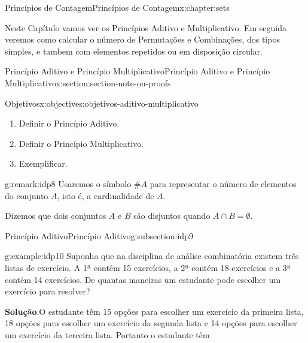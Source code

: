 \documentclass[oneside,10pt,]{book}
\newcommand{\blocktitlefont}{\relax}
\numberwithin{equation}{section}
\begin{document}
\begin{chapterptx}{Princípios de Contagem}{}{Princípios de Contagem}{}{}{x:chapter:sets}
\begin{introduction}{}%
Neste Capítulo vamos ver os Princípios Aditivo e Multiplicativo. Em seguida veremos como calcular o número de Permutações e Combinações, dos tipos simples, e tambem com elementos repetidos ou em disposição circular.%
\end{introduction}%
%
%
\typeout{************************************************}
\typeout{************************************************}
%
\begin{sectionptx}{Princípio Aditivo e Princípio Multiplicativo}{}{Princípio Aditivo e Princípio Multiplicativo}{}{}{x:section:section-note-on-proofs}
\begin{objectives}{Objetivos}{x:objectives:objetivos-aditivo-multiplicativo}
%
\begin{enumerate}
\item{}Definir o Princípio Aditivo.%
\item{}Definir o Princípio Multiplicativo.%
\item{}Exemplificar.%
\end{enumerate}
\end{objectives}
\begin{introduction}{}%
\begin{remark}{}{g:remark:idp8}%
Usaremos o símbolo \(\#A\) para representar o número de elementos do conjunto \(A\), isto é, a cardinalidade de \(A\).%
\par
Dizemos que dois conjuntos \(A\) e \(B\) são disjuntos quando \(A\cap B=\emptyset\).%
\end{remark}
\end{introduction}%
%
%
\typeout{************************************************}
\typeout{************************************************}
%
\begin{subsectionptx}{Princípio Aditivo}{}{Princípio Aditivo}{}{}{g:subsection:idp9}
\begin{example}{}{g:example:idp10}%
Suponha que na disciplina de análise combinatória existem três listas de exercício. A 1ª contém 15 exercícios, a 2ª contém 18 exercícios e a 3ª contém 14 exercícios. De quantas maneiras um estudante pode escolher um exercício para resolver?%
\end{example}
\textbf{\blocktitlefont Solução}.\quad{}O estudante têm 15 opções para escolher um exercício da primeira lista, 18 opções para escolher um exercício da segunda lista e 14 opções para escolher um exercício da terceira lista. Portanto o estudante têm%

\end{subsectionptx}
\end{sectionptx}
\end{chapterptx}
\end{document}
